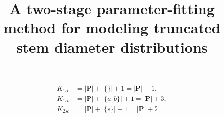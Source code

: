 \message{ !name(article.tex)}\documentclass{article}
\title{A two-stage parameter-fitting method for modeling truncated stem diameter distributions}
\author{}
\date{}
\begin{document}
\begin{align} K_{1sc} & =  |\mathbf{P}| + |\{\}| + 1 = |\mathbf{P}| + 1,\\
  K_{1st} & =  |\mathbf{P}| + |\{a, b\}| + 1 = |\mathbf{P}| + 3,\\
  K_{2sc} & = |\mathbf{P}| + |\{s\}| + 1 = |\mathbf{P}| + 2
  \end{align}
\end{document}
